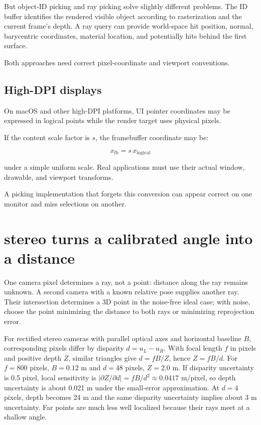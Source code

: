 But object-ID picking and ray picking solve slightly different problems. The ID buffer identifies the rendered visible object according to rasterization and the current frame's depth. A ray query can provide world-space hit position, normal, barycentric coordinates, material location, and potentially hits behind the first surface.

Both approaches need correct pixel-coordinate and viewport conventions.

\subsection{High-DPI displays}\label{02-foundations-ii-ch035-high-dpi-displays}

On macOS and other high-DPI platforms, UI pointer coordinates may be expressed in logical points while the render target uses physical pixels.

If the content scale factor is \(s\), the framebuffer coordinate may be:

\[ x_{\mathrm{fb}}=s\,x_{\mathrm{logical}} \]

under a simple uniform scale. Real applications must use their actual window, drawable, and viewport transforms.

A picking implementation that forgets this conversion can appear correct on one monitor and miss selections on another.

\section{stereo turns a calibrated angle into a distance}\label{02-foundations-ii-ch035-stereo-turns-a-calibrated-angle-into-a-distance}

One camera pixel determines a ray, not a point: distance along the ray remains unknown. A second camera with a known relative pose supplies another ray. Their intersection determines a 3D point in the noise-free ideal case; with noise, choose the point minimizing the distance to both rays or minimizing reprojection error.

For rectified stereo cameras with parallel optical axes and horizontal baseline \(B\), corresponding pixels differ by disparity \(d=u_L-u_R\). With focal length \(f\) in pixels and positive depth \(Z\), similar triangles give \(d=fB/Z\), hence \(Z=fB/d\). For \(f=800\) pixels, \(B=0.12\) m and \(d=48\) pixels, \(Z=2.0\) m. If disparity uncertainty is 0.5 pixel, local sensitivity is \(|\partial Z/\partial d|=fB/d^2\approx0.0417\) m/pixel, so depth uncertainty is about 0.021 m under the small-error approximation. At \(d=4\) pixels, depth becomes 24 m and the same disparity uncertainty implies about 3 m uncertainty. Far points are much less well localized because their rays meet at a shallow angle.

